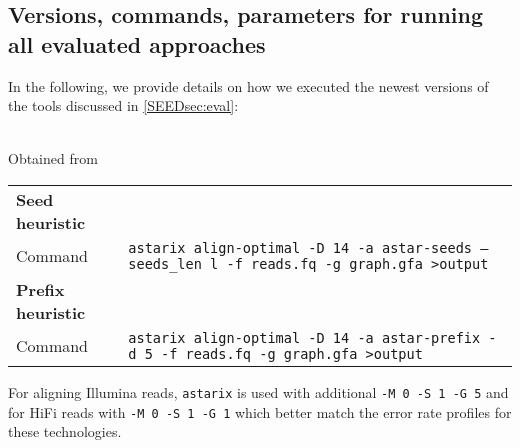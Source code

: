 \subsection{Versions, commands, parameters for running all evaluated approaches} \label{SEEDsec:commands}
In the following, we provide details on how we executed the newest versions of
the tools discussed in \cref{SEEDsec:eval}:

 \\
\noindent Obtained from \astarixurl \\
\noindent
\begin{tabular}{lp{9.5cm}}
	\textbf{Seed heuristic} & \\
	\quad Command & \texttt{astarix align-optimal -D 14 -a astar-seeds --seeds\_len l -f reads.fq -g graph.gfa >output} \\
	\textbf{Prefix heuristic} & \\
	\quad Command & \texttt{astarix align-optimal -D 14 -a astar-prefix -d 5 -f reads.fq -g graph.gfa >output} \\
\end{tabular}

For aligning Illumina reads, \texttt{astarix} is used with additional \texttt{-M
0 -S 1 -G 5} and for HiFi reads with \texttt{-M 0 -S 1 -G 1} which better match
the error rate profiles for these technologies.

